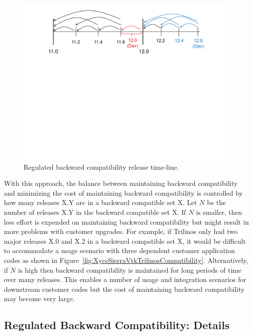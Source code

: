 \documentclass[11pt]{SANDreport}
\begin{document}
\begin{figure}
\begin{center}
\includegraphics[trim = 1.0in 5.0in 1.0in 0.2in, scale=0.55]
{BackwardCompatibilityTimeline}
{}\caption{Regulated backward compatibility release time-line.}
\label{fig:BackwardCompatibilityTimeline}
\end{center}
\end{figure}

With this approach, the balance between maintaining backward
compatibility and minimizing the cost of maintaining backward
compatibility is controlled by how many releases X.Y are in a
backward compatible set X.  Let $N$ be the number of releases X.Y in
the backward compatible set X.  If $N$ is smaller, then less effort is
expended on maintaining backward compatibility but might result in
more problems with customer upgrades.  For example, if Trilinos only
had two major releases X.0 and X.2 in a backward compatible set X, it
would be difficult to accommodate a usage scenario with three
dependent customer application codes as shown in
Figure~\ref{fig:XyceSierraVtkTrilinosCompatibility}.  Alternatively,
if $N$ is high then backward compatibility is maintained for long
periods of time over many releases.  This enables a number of usage
and integration scenarios for downstream customer codes but the cost
of maintaining backward compatibility may become very large.


%
{}\subsection{Regulated Backward Compatibility: Details}
\label{sec:details_reg_back_compat}
%
\end{document}
